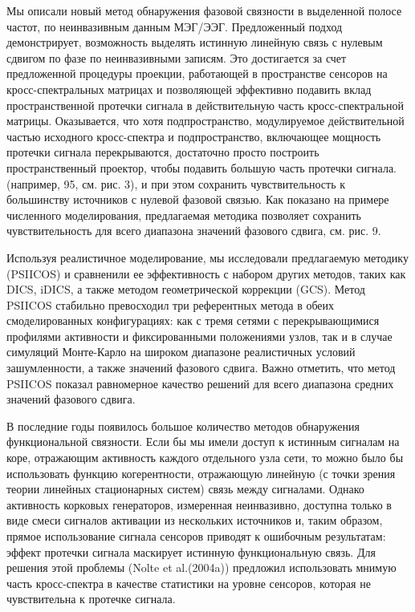 
Мы описали новый метод обнаружения фазовой связности в выделенной полосе
частот, по неинвазивным данным МЭГ/ЭЭГ. Предложенный подход демонстрирует,
возможность выделять истинную линейную связь с нулевым сдвигом по фазе по
неинвазивными записям.  Это достигается за счет предложенной процедуры
проекции, работающей в пространстве сенсоров на кросс-спектральных матрицах и
позволяющей эффективно подавить вклад пространственной протечки сигнала в
действительную часть кросс-спектральной матрицы. Оказывается, что хотя
подпространство, модулируемое действительной частью исходного кросс-спектра и
подпространство, включающее мощность протечки сигнала перекрываются, достаточно
просто построить пространственный проектор, чтобы подавить большую часть
протечки сигнала.  (например, 95, см. рис. 3), и при этом сохранить
чувствительность к большинству источников с нулевой фазовой связью. Как
показано на примере численного моделирования, предлагаемая методика позволяет
сохранить чувствительность для всего диапазона значений фазового сдвига, см. рис. 9.

Используя реалистичное моделирование, мы исследовали предлагаемую методику
(PSIICOS) и сравненили ее эффективность с набором других методов, таких как
DICS, iDICS, а также методом геометрической коррекции (GCS). Метод PSIICOS
стабильно превосходил три референтных метода в обеих смоделированных конфигурациях:
как с тремя сетями с перекрывающимися профилями активности и фиксированными положениями
узлов, так и в случае симуляций Монте-Карло на широком диапазоне реалистичных
условий зашумленности, а также значений фазового сдвига.  Важно отметить, что
метод PSIICOS показал равномерное качество решений для всего диапазона средних
значений фазового сдвига.

В последние годы появилось большое количество методов обнаружения
функциональной связности.  Если бы мы имели доступ к истинным сигналам на коре,
отражающим активность каждого отдельного узла сети, то можно было бы
использовать функцию когерентности, отражающую линейную (с точки зрения теории
линейных стационарных систем) связь между сигналами.  Однако активность
корковых генераторов, измеренная неинвазивно, доступна только в виде смеси
сигналов активации из нескольких источников и, таким образом, прямое
использование сигнала сенсоров приводят к ошибочным результатам: эффект
протечки сигнала маскирует истинную функциональную связь. Для решения этой
проблемы (Nolte et al.(2004a)) предложил использовать мнимую часть
кросс-спектра в качестве статистики на уровне сенсоров, которая не чувствительна к
протечке сигнала.

